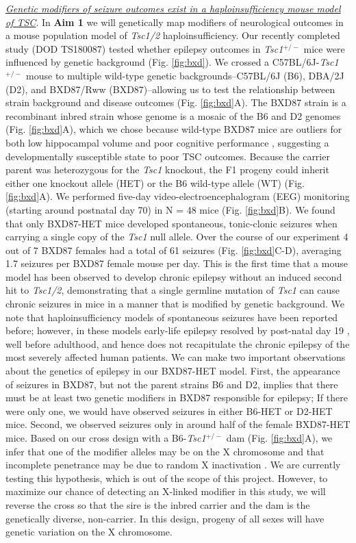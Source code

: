 \documentclass[
  12pt,
]{article}
\begin{document}
\textit{\underline{Genetic modifiers of seizure outcomes exist in a haploinsufficiency mouse model of TSC}}.
In \textbf{Aim 1} we will genetically map modifiers of neurological
outcomes in a mouse population model of \textit{Tsc1/2}
haploinsufficiency. Our recently completed study (DOD TS180087) tested
whether epilepsy outcomes in \textit{Tsc1}\(^{+/-}\) mice were
influenced by genetic background (Fig. \ref{fig:bxd}). We crossed a
C57BL/6J-\textit{Tsc1}\(^{+/-}\) mouse to multiple wild-type genetic
backgrounds--C57BL/6J (B6), DBA/2J (D2), and BXD87/Rww (BXD87)--allowing
us to test the relationship between strain background and disease
outcomes (Fig. \ref{fig:bxd}A). The BXD87 strain is a recombinant inbred
strain whose genome is a mosaic of the B6 and D2 genomes (Fig.
\ref{fig:bxd}A), which we chose because wild-type BXD87 mice are
outliers for both low hippocampal volume and poor cognitive performance
\cite{26449520, 28544613, 29457871}, suggesting a developmentally
susceptible state to poor TSC outcomes. Because the carrier parent was
heterozygous for the \textit{Tsc1} knockout, the F1 progeny could
inherit either one knockout allele (HET) or the B6 wild-type allele (WT)
(Fig. \ref{fig:bxd}A). We performed five-day video-electroencephalogram
(EEG) monitoring (starting around postnatal day 70) in N = 48 mice (Fig.
\ref{fig:bxd}B). We found that only BXD87-HET mice developed
spontaneous, tonic-clonic seizures when carrying a single copy of the
\textit{Tsc1} null allele. Over the course of our experiment 4 out of 7
BXD87 females had a total of 61 seizures (Fig. \ref{fig:bxd}C-D),
averaging 1.7 seizures per BXD87 female mouse per day. This is the first
time that a mouse model has been observed to develop chronic epilepsy
without an induced second hit to \textit{Tsc1/2}, demonstrating that a
single germline mutation of \textit{Tsc1} can cause chronic seizures in
mice in a manner that is modified by genetic background. We note that
haploinsufficiency models of spontaneous seizures have been reported
before; however, in these models early-life epilepsy resolved by
post-natal day 19 \cite{25081057}, well before adulthood, and hence does
not recapitulate the chronic epilepsy of the most severely affected
human patients. We can make two important observations about the
genetics of epilepsy in our BXD87-HET model. First, the appearance of
seizures in BXD87, but not the parent strains B6 and D2, implies that
there must be at least two genetic modifiers in BXD87 responsible for
epilepsy; If there were only one, we would have observed seizures in
either B6-HET or D2-HET mice. Second, we observed seizures only in
around half of the female BXD87-HET mice. Based on our cross design with
a B6-\textit{Tsc1}\(^{+/-}\) dam (Fig. \ref{fig:bxd}A), we infer that
one of the modifier alleles may be on the X chromosome and that
incomplete penetrance may be due to random X inactivation
\cite{15818384, 9618446}. We are currently testing this hypothesis,
which is out of the scope of this project. However, to maximize our
chance of detecting an X-linked modifier in this study, we will reverse
the cross so that the sire is the inbred carrier and the dam is the
genetically diverse, non-carrier. In this design, progeny of all sexes
will have genetic variation on the X chromosome.
\end{document}
